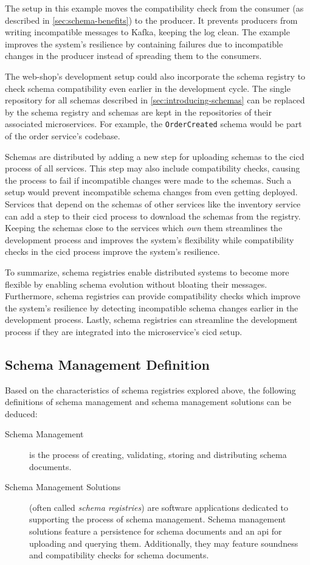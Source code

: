 The setup in this example moves the compatibility check from the consumer (as described in \ref{sec:schema-benefits}) to the producer.
It prevents producers from writing incompatible messages to Kafka, keeping the log clean.
The example improves the system's resilience by containing failures due to incompatible changes in the producer instead of spreading them to the consumers.

The web-shop's development setup could also incorporate the schema registry to check schema compatibility even earlier in the development cycle.
The single repository for all schemas described in \ref{sec:introducing-schemas} can be replaced by the schema registry and schemas are kept in the repositories of their associated microservices.
For example, the \texttt{OrderCreated} schema would be part of the order service's codebase.

Schemas are distributed by adding a new step for uploading schemas to the \gls{cicd} process of all services.
This step may also include compatibility checks, causing the process to fail if incompatible changes were made to the schemas.
Such a setup would prevent incompatible schema changes from even getting deployed.
Services that depend on the schemas of other services like the inventory service can add a step to their \gls{cicd} process to download the schemas from the registry.
Keeping the schemas close to the services which \emph{own} them streamlines the development process and improves the system's flexibility while compatibility checks in the \gls{cicd} process improve the system's resilience.

To summarize, schema registries enable distributed systems to become more flexible by enabling schema evolution without bloating their messages.
Furthermore, schema registries can provide compatibility checks which improve the system's resilience by detecting incompatible schema changes earlier in the development process.
Lastly, schema registries can streamline the development process if they are integrated into the microservice's \gls{cicd} setup.

\subsection{Schema Management Definition}\label{sec:schema-management-definition}

Based on the characteristics of schema registries explored above, the following definitions of schema management and schema management solutions can be deduced:

\begin{description}
  \item[Schema Management] is the process of creating, validating, storing and distributing schema documents.
  \item[Schema Management Solutions] (often called \emph{schema registries}) are software applications dedicated to supporting the process of schema management.
  Schema management solutions feature a persistence for schema documents and an \gls{api} for uploading and querying them.
  Additionally, they may feature soundness and compatibility checks for schema documents.
\end{description}
